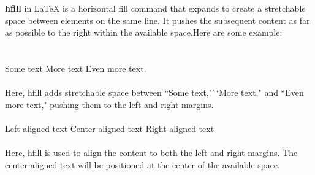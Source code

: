 \documentclass[a4paper]{article}
\begin{document}
	\Large {\bf hfill} in LaTeX is a horizontal fill command that expands to create a stretchable space between elements on the same line. It pushes the subsequent content as far as possible to the right within the available space.Here are some example:\\\\\\
	Some text \hfill More text \hfill Even more text.\\\\
	Here, hfill adds stretchable space between ``Some text,"``More text," and ``Even more text," pushing them to the left and right margins.\\\\
	\hfill Left-aligned text \hfill Center-aligned text \hfill Right-aligned text \hfill \\\\
	Here, hfill is used to align the content to both the left and right margins. The center-aligned text will be positioned at the center of the available space.
	
\end{document}
